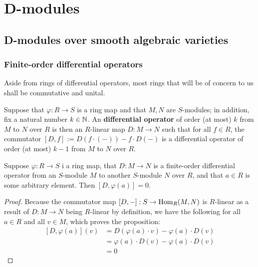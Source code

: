 \section{D-modules}
    \subsection{D-modules over smooth algebraic varieties}
        \subsubsection{Finite-order differential operators}
            \begin{convention}
                Aside from rings of differential operators, most rings that will be of concern to us shall be commutative and unital.
            \end{convention}
            \begin{definition} \label{def: differential_operators}
                Suppose that $\varphi: R \to S$ is a ring map and that $M, N$ are $S$-modules; in addition, fix a natural number $k \in \mathbb{N}$. An \textbf{differential operator} of order (at most) $k$ from $M$ to $N$ over $R$ is then an $R$-linear map $D: M \to N$ such that for all $f \in R$, the commutator $[D, f] := D(f \cdot (-)) - f \cdot D(-)$ is a differential operator of order (at most) $k - 1$ from $M$ to $N$ over $R$. 
            \end{definition}
            \begin{proposition} \label{prop: differential_operators_act_as_zero_on_constants}
                Suppose $\varphi: R \to S$ i a ring map, that $D: M \to N$ is a finite-order differential operator from an $S$-module $M$ to another $S$-module $N$ over $R$, and that $a \in R$ is some arbitrary element. Then $[D, \varphi(a)] = 0$.
            \end{proposition}
                \begin{proof}
                    Because the commutator map $[D, -]: S \to \mathrm{Hom}_R(M, N)$ is $R$-linear as a result of $D: M \to N$ being $R$-linear by definition, we have the following for all $a \in R$ and all $v \in M$, which proves the proposition:
                        $$
                            \begin{aligned}
                                [D, \varphi(a)](v) & = D(\varphi(a) \cdot v) - \varphi(a) \cdot D(v)
                                \\
                                & = \varphi(a) \cdot D(v) - \varphi(a) \cdot D(v)
                                \\
                                & = 0
                            \end{aligned}
                        $$
                \end{proof}
